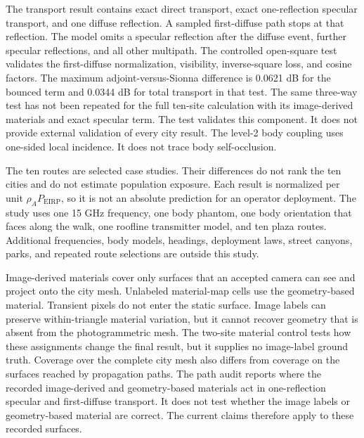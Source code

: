 The transport result contains exact direct transport, exact one-reflection
specular transport, and one diffuse reflection. A sampled first-diffuse path
stops at that reflection. The model omits a specular reflection after the
diffuse event, further specular reflections, and all other multipath. The controlled open-square
test validates the first-diffuse normalization, visibility, inverse-square loss,
and cosine factors. The maximum adjoint-versus-Sionna difference is 0.0621 dB
for the bounced term and 0.0344 dB for total transport in that test. The same
three-way test has not been repeated for the full ten-site calculation with its
image-derived materials and exact specular term. The test validates this component. It
does not provide external validation of every city result. The level-2 body
coupling uses one-sided local incidence. It does not trace body self-occlusion.

The ten routes are selected case studies. Their differences do not rank the
ten cities and do not estimate population exposure. Each result is normalized
per unit $\rho_A P_{\mathrm{EIRP}}$, so it is not an absolute prediction for an
operator deployment. The study uses one 15 GHz frequency, one body phantom,
one body orientation that faces along the walk, one roofline transmitter model, and ten
plaza routes. Additional frequencies, body models, headings, deployment laws,
street canyons, parks, and repeated route selections are outside this study.

Image-derived materials cover only surfaces that an accepted camera can see and
project onto the city mesh. Unlabeled material-map cells use the geometry-based
material. Transient pixels do not enter the static surface. Image labels can
preserve within-triangle material variation, but it cannot recover geometry
that is absent from the photogrammetric mesh. The two-site material control
tests how these assignments change the final result, but it supplies no image-label
ground truth. Coverage over the complete city mesh also differs from coverage
on the surfaces reached by propagation paths. The path audit reports where the
recorded image-derived and geometry-based materials act in one-reflection
specular and first-diffuse transport. It does not test whether the image labels
or geometry-based material are correct. The current claims therefore apply to
these recorded surfaces.

\clearpage

